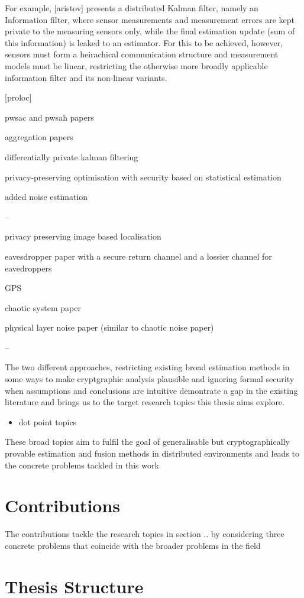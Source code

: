 For example, [aristov] presents a distributed Kalman filter, namely an Information filter, where sensor measurements and measurement errors are kept private to the measuring sensors only, while the final estimation update (sum of this information) is leaked to an estimator. For this to be achieved, however, sensors must form a heirachical communication structure and measurement models must be linear, restricting the otherwise more broadly applicable information filter and its non-linear variants.

[proloc]

pwsac and pwsah papers

aggregation papers

differentially private kalman filtering

privacy-preserving optimisation with security based on statistical estimation

added noise estimation

--

privacy preserving image based localisation

eavesdropper paper with a secure return channel and a lossier channel for eavedroppers

GPS

chaotic system paper

physical layer noise paper (similar to chaotic noise paper)

--


The two different approaches, restricting existing broad estimation methods in some ways to make cryptgraphic analysis plausible and ignoring formal security when assumptions and conclusions are intuitive demontrate a gap in the existing literature and brings us to the target research topics this thesis aims explore.

\begin{itemize}
    \item dot point topics
\end{itemize}

These broad topics aim to fulfil the goal of generalisable but cryptographically provable estimation and fusion methods in distributed environments and leads to the concrete problems tackled in this work

\section{Contributions}

The contributions tackle the research topics in section .. by considering three concrete problems that coincide with the broader problems in the field



\section{Thesis Structure}